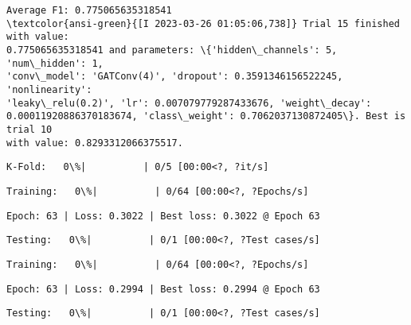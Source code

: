 \documentclass[11pt]{article}
\begin{document}
    
    \begin{Verbatim}[commandchars=\\\{\}]
Average F1: 0.775065635318541
\textcolor{ansi-green}{[I 2023-03-26 01:05:06,738]} Trial 15 finished with value:
0.775065635318541 and parameters: \{'hidden\_channels': 5, 'num\_hidden': 1,
'conv\_model': 'GATConv(4)', 'dropout': 0.3591346156522245, 'nonlinearity':
'leaky\_relu(0.2)', 'lr': 0.007079779287433676, 'weight\_decay':
0.00011920886370183674, 'class\_weight': 0.7062037130872405\}. Best is trial 10
with value: 0.8293312066375517.
    \end{Verbatim}

    
    \begin{Verbatim}[commandchars=\\\{\}]
K-Fold:   0\%|          | 0/5 [00:00<?, ?it/s]
    \end{Verbatim}

    
    
    \begin{Verbatim}[commandchars=\\\{\}]
Training:   0\%|          | 0/64 [00:00<?, ?Epochs/s]
    \end{Verbatim}

    
    \begin{Verbatim}[commandchars=\\\{\}]
Epoch: 63 | Loss: 0.3022 | Best loss: 0.3022 @ Epoch 63
    \end{Verbatim}

    
    \begin{Verbatim}[commandchars=\\\{\}]
Testing:   0\%|          | 0/1 [00:00<?, ?Test cases/s]
    \end{Verbatim}

    
    
    \begin{Verbatim}[commandchars=\\\{\}]
Training:   0\%|          | 0/64 [00:00<?, ?Epochs/s]
    \end{Verbatim}

    
    \begin{Verbatim}[commandchars=\\\{\}]
Epoch: 63 | Loss: 0.2994 | Best loss: 0.2994 @ Epoch 63
    \end{Verbatim}

    
    \begin{Verbatim}[commandchars=\\\{\}]
Testing:   0\%|          | 0/1 [00:00<?, ?Test cases/s]
    \end{Verbatim}
\end{document}
